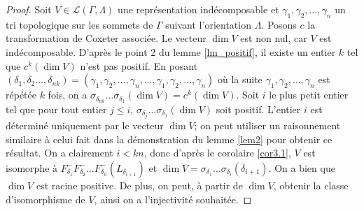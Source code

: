 \documentclass[a4paper,11pt]{article}
\begin{document}
\begin{proof}
Soit $V \in \mathscr L(\Gamma,\Lambda)$ une représentation indécomposable et $\gamma_{1}, \gamma_{2}, \dots, \gamma_{n} $ un tri topologique sur les sommets de $\Gamma$ suivant l'orientation $\Lambda$. Posons $c$ la transformation de Coxeter associée. Le vecteur $\dim V$ est non nul, car $V$ est indécomposable. D'après le point 2 du lemme \ref{lm_positif}, il existe un entier $k$ tel que $c^{k}(\dim V)$ n'est pas positif. En posant $(\delta_{1},\delta_{2} \dots, \delta_{nk}) = (\gamma_{1}, \gamma_{2}, \dots, \gamma_{n}, \dots, \gamma_{1}, \gamma_{2}, \dots, \gamma_{n})$ où la suite $\gamma_{1}, \gamma_{2}, \dots, \gamma_{n}$ est répétée $k$ fois, on a $\sigma_{\delta_{nk}} \dots \sigma_{\delta_{1}}(\dim V) = c^{k}(\dim V)$. Soit $i$ le plus petit entier tel que pour tout entier $j \leq i$, $\sigma_{\delta_{j}} \dots \sigma_{\delta_{1}}(\dim V)$ soit positif. L'entier $i$ est déterminé uniquement par le vecteur $\dim V$; on peut utiliser un raisonnement similaire à celui fait dans la démonstration du lemme \ref{lem2} pour obtenir ce résultat. On a clairement $i < kn$, donc d'après le corolaire \ref{cor3.1}, $V$ est isomorphe à $F^{-}_{\delta_{1}}F^{-}_{\delta_{2}} \dots F^{-}_{\delta_{n}}(L_{\delta_{i+1}})$ et $\dim V = \sigma_{\delta_{1}} \dots \sigma_{\delta_{i}}(\overline{\delta}_{i+1})$. On a bien que $\dim V$ est racine positive. De plus, on peut, à partir de $\dim V$, obtenir la classe d'isomorphisme de $V$, ainsi on a l'injectivité souhaitée.
	

\end{proof}
\end{document}
